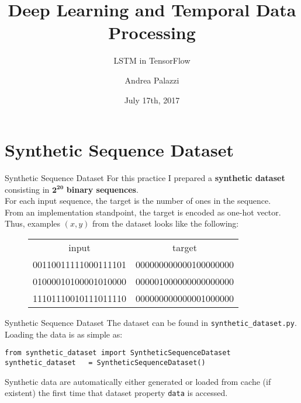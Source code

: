 \documentclass[aspectratio=169]{beamer}
\title[Deep Learning and Temporal Data Processing]{Deep Learning and Temporal Data Processing}
\subtitle{LSTM in TensorFlow}
\institute{University of Modena and Reggio Emilia}
\author{Andrea Palazzi}
\date{July 17th, 2017}
\def\thisframelogos{}
\newcommand{\framelogo}[1]{\def\thisframelogos{#1}}
\begin{document}
\framelogo{img/template/logo_unimore_white.png}





\section{Synthetic Sequence Dataset}

\begin{frame}[fragile]{Synthetic Sequence Dataset}
For this practice I prepared a \textbf{synthetic dataset} consisting in $\bm{2^{20}}$ \textbf{binary sequences}.\\
\vspace{0.5cm}
For each input sequence, the target is the number of ones in the sequence.\\
\vspace{0.5cm}
From an implementation standpoint, the target is encoded as one-hot vector. Thus, examples $(x, y)$ from the dataset looks like the following:
\begin{figure}
\centering
\begin{tabular}{cc}
input & target\\
00110011111000111101 & 000000000000100000000\\
01000010100001010000 & 000001000000000000000\\
11101110010111011110 & 000000000000001000000
\end{tabular}
\end{figure}
\end{frame}

\begin{frame}[fragile]{Synthetic Sequence Dataset}
The dataset can be found in \texttt{synthetic\_dataset.py}.\\
\vspace{0.5cm}
Loading the data is as simple as:
\begin{verbatim}
from synthetic_dataset import SyntheticSequenceDataset
synthetic_dataset   = SyntheticSequenceDataset()
\end{verbatim}
Synthetic data are automatically either generated or loaded from cache (if existent) the first time that dataset property \texttt{data} is accessed.
\end{frame}
\end{document}
